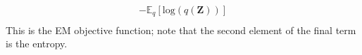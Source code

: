 \documentclass[12pt]{article}
\begin{document}
\begin{equation*}
\begin{split}
             - \mathbb{E}_q \left[\text{log} \left( q(\textbf{Z}) \right) \right] \\
    \end{split}
\end{equation*}
This is the EM objective function; note that the second element of the final term is the entropy.\\
\end{document}
